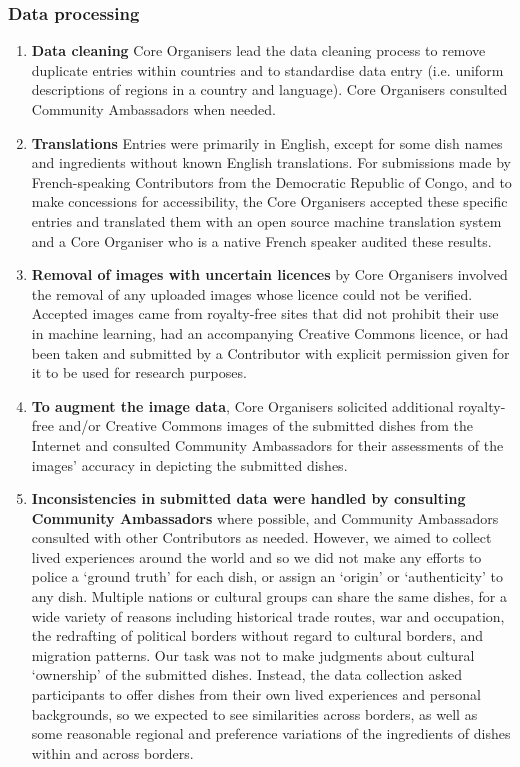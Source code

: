 \subsubsection{Data processing}

\begin{enumerate}
    \item \textbf{Data cleaning} Core Organisers lead the data cleaning process to remove duplicate entries within countries and to standardise data entry (i.e. uniform descriptions of regions in a country and language). Core Organisers consulted Community Ambassadors when needed.
    \item \textbf{Translations} Entries were primarily in English, except for some dish names and ingredients without known English translations. For submissions made by French-speaking Contributors from the Democratic Republic of Congo, and to make concessions for accessibility, the Core Organisers accepted these specific entries and translated them with an open source machine translation system and a Core Organiser who is a native French speaker audited these results.
    \item \textbf{Removal of images with uncertain licences} by Core Organisers involved the removal of any uploaded images whose licence could not be verified. Accepted images came from royalty-free sites that did not prohibit their use in machine learning, had an accompanying Creative Commons licence, or had been taken and submitted by a Contributor with explicit permission given for it to be used for research purposes. 
    \item \textbf{To augment the image data}, Core Organisers solicited additional royalty-free and/or Creative Commons images of the submitted dishes from the Internet and consulted Community Ambassadors for their assessments of the images' accuracy in depicting the submitted dishes.
    \item \textbf{Inconsistencies in submitted data were handled by consulting Community Ambassadors} where possible, and Community Ambassadors consulted with other Contributors as needed. However, we aimed to collect lived experiences around the world and so we did not make any efforts to police a `ground truth' for each dish, or assign an `origin' or `authenticity' to any dish. Multiple nations or cultural groups can share the same dishes, for a wide variety of reasons including historical trade routes, war and occupation, the redrafting of political borders without regard to cultural borders, and migration patterns. Our task was not to make judgments about cultural `ownership' of the submitted dishes. Instead, the data collection asked participants to offer dishes from their own lived experiences and personal backgrounds, so we expected to see similarities across borders, as well as some reasonable regional and preference variations of the ingredients of dishes within and across borders.
\end{enumerate}



























